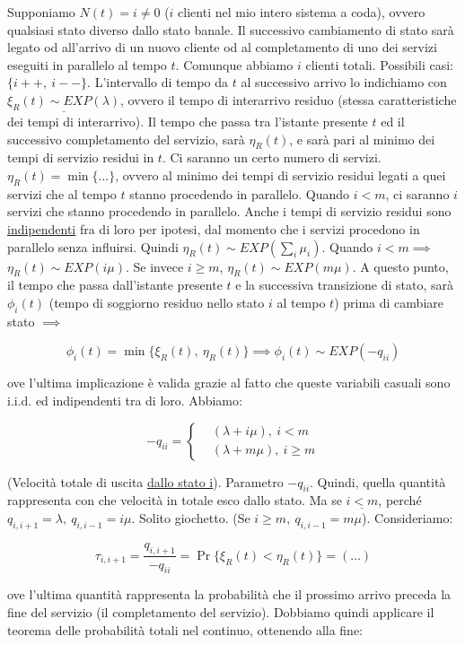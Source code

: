 Supponiamo $N(t)=i\neq 0$ ($i$ clienti nel mio intero sistema a coda), ovvero qualsiasi stato diverso dallo stato banale. Il successivo cambiamento di stato sarà legato od all'arrivo di un nuovo cliente od al completamento di uno dei servizi eseguiti in parallelo al tempo $t$. Comunque abbiamo $i$ clienti totali. Possibili casi: $\{i++,\ i--\}$. L'intervallo di tempo da $t$ al successivo arrivo lo indichiamo con $\underline{\xi_R(t) \sim EXP(\lambda)}$, ovvero il tempo di interarrivo residuo (stessa caratteristiche dei tempi di interarrivo). Il tempo che passa tra l'istante presente $t$ ed il successivo completamento del servizio, sarà $\eta_R(t)$, e sarà pari al minimo dei tempi di servizio residui in $t$. Ci saranno un certo numero di servizi. $\eta_R(t) = \min{\{...\}}$, ovvero al minimo dei tempi di servizio residui legati a quei servizi che al tempo $t$ stanno procedendo in parallelo. Quando $i<m$, ci saranno $i$ servizi che stanno procedendo in parallelo. Anche i tempi di servizio residui sono \underline{indipendenti} fra di loro per ipotesi, dal momento che i servizi procedono in parallelo senza influirsi. Quindi $\eta_R(t) \sim EXP(\sum_i{\mu_i})$. Quando $i<m\implies$ $\eta_R(t) \sim EXP(i\mu)$. Se invece $i\geq m$, $\eta_R(t) \sim EXP(m\mu)$. A questo punto, il tempo che passa dall'istante presente $t$ e la successiva transizione di stato, sarà $\phi_i(t)$ (tempo di soggiorno residuo nello stato $i$ al tempo $t$) prima di cambiare stato $\implies$

\[
	\phi_i(t) = \min{\{\xi_R(t),\ \eta_R(t)\}} \implies \phi_i(t) \sim EXP(-q_{ii})
\]

ove l'ultima implicazione è valida grazie al fatto che queste variabili casuali sono i.i.d. ed indipendenti tra di loro. Abbiamo:

\[
	-q_{ii} = \left\{
	\begin{aligned}
	&(\lambda+i\mu),\ i<m\\
	&(\lambda+m\mu),\ i\geq m
	\end{aligned}
	\right.
\]

(Velocità totale di uscita \underline{dallo stato i}). Parametro $-q_{ii}$. Quindi, quella quantità rappresenta con che velocità in totale esco dallo stato. Ma se $\underline{i<m}$, perché $q_{i,i+1} = \lambda,\ q_{i,i-1}=i\mu$. Solito giochetto. (Se $i\geq m,\ q_{i,i-1}=m\mu$). Consideriamo:

\[
	\tau_{i,i+1} = \frac{q_{i,i+1}}{-q_{ii}} = \Pr\{\xi_R(t) < \eta_R(t)\} = (\dots)
\]

ove l'ultima quantità rappresenta la probabilità che il prossimo arrivo preceda la fine del servizio (il completamento del servizio). Dobbiamo quindi applicare il teorema delle probabilità totali nel continuo, ottenendo alla fine:

